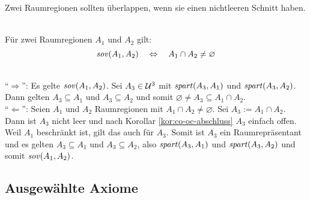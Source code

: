 %    
%    
%    
    Zwei Raumregionen sollten überlappen, wenn sie einen nichtleeren Schnitt haben.
    \begin{satz}\label{satz:sov-raumreg}\ \\
        Für zwei Raumregionen $A_1$ und $A_2$ gilt: 
        $$\mathit{sov}(A_1,A_2) \quad \Leftrightarrow \quad A_1 \cap A_2 \neq \varnothing$$
    \end{satz}
    \begin{bew}\ \\
        ``$\boldsymbol{\Rightarrow}$'':
        Es gelte $\mathit{sov}(A_1,A_2)$. 
        Sei $A_3 \in \mathcal{U}^3$ mit $\mathit{spart}(A_3,A_1)$ und $\mathit{spart}(A_3,A_2)$.
        Dann gelten $A_3 \subseteq A_1$ und $A_3 \subseteq A_2$ und somit $\varnothing \neq A_3 \subseteq A_1 \cap A_2$.\\
        ``$\boldsymbol{\Leftarrow}$'':
        Seien $A_1$ und $A_2$ Raumregionen mit $A_1 \cap A_2 \neq \varnothing$.
        Sei $A_3 := A_1 \cap A_2$.
        Dann ist $A_3$ nicht leer und nach Korollar \ref{kor:co-oc-abschluss} $A_3$ einfach offen.
        Weil $A_1$ beschränkt ist, gilt das auch für $A_3$.
        Somit ist $A_3$ ein Raumrepräsentant und es gelten $A_3 \subseteq A_1$ und $A_3 \subseteq A_2$, also $\mathit{spart}(A_3,A_1)$ und $\mathit{spart}(A_3,A_2)$ und somit $\mathit{sov}(A_1,A_2)$.
    \end{bew}


\subsection{Ausgewählte Axiome}

